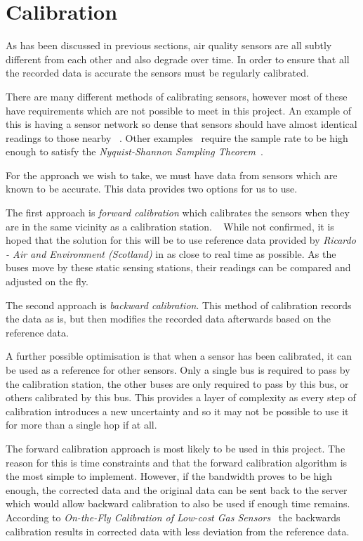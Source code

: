 \section{Calibration}\label{calibration}

As has been discussed in previous sections,  air quality sensors are all subtly different from each other and also degrade over time. In order to ensure that all the recorded data is accurate the sensors must be regularly calibrated. 

There are many different methods of calibrating sensors, however most of these have requirements which are not possible to meet in this project. An example of this is having a sensor network so dense that sensors should have almost identical readings to those nearby ~\cite{collaborativeinplacecalibration}. Other examples~\cite{blindcalibration} require the sample rate to be high enough to satisfy the \emph{Nyquist-Shannon Sampling Theorem}~\cite{samplingtheoremorigins}. 

For the approach we wish to take, we must have data from sensors which are known to be accurate. This data provides two options for us to use. 

The first approach is \emph{forward calibration} which calibrates the sensors when they are in the same vicinity as a calibration station. ~\cite{ontheflycalibration} While not confirmed, it is hoped that the solution for this will be to use reference data provided by \emph{Ricardo - Air and Environment (Scotland)} in as close to real time as possible. As the buses move by these static sensing stations, their readings can be compared and adjusted on the fly. 

The second approach is \emph{backward calibration}. This method of calibration records the data as is, but then modifies the recorded data afterwards based on the reference data. 

A further possible optimisation is that when a sensor has been calibrated, it can be used as a reference for other sensors. Only a single bus is required to pass by the calibration station, the other buses are only required to pass by this bus, or others calibrated by this bus. This provides a layer of complexity as every step of calibration introduces a new uncertainty and so it may not be possible to use it for more than a single hop if at all. 

The forward calibration approach is most likely to be used in this project. The reason for this is time constraints and that the forward calibration algorithm is the most simple to implement. However, if the bandwidth proves to be high enough, the corrected data and the original data can be sent back to the server which would allow backward calibration to also be used if enough time remains. According to \emph{On-the-Fly Calibration of Low-cost Gas Sensors}~\cite{ontheflycalibration} the backwards calibration results in corrected data with less deviation from the reference data. 

